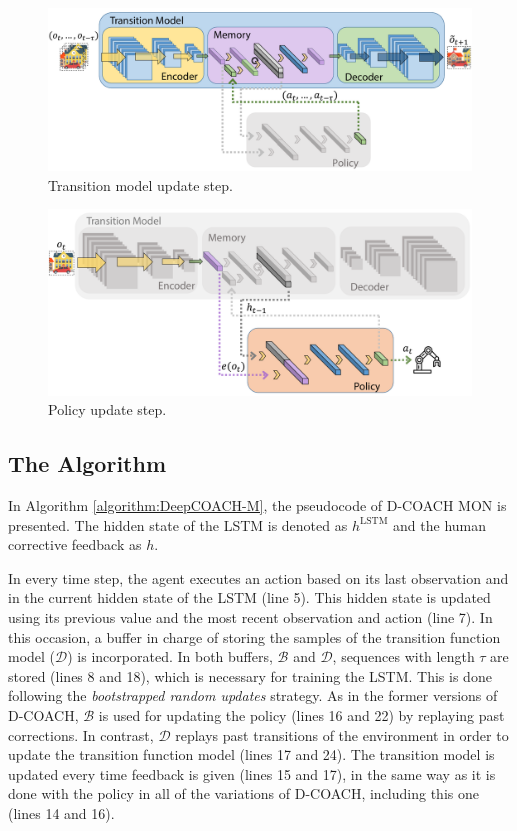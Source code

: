 \begin{figure}[h]
    \centering
    \includegraphics[width=0.93\linewidth]{imagenes/cap4/hd_mon1.pdf}
    \caption{Transition model update step.}
    \label{fig:hd_mon_train1}
\end{figure}

\begin{figure}[h]
    \centering
    \vspace{1.5cm}
    \includegraphics[width=0.93\linewidth]{imagenes/cap4/hd_mon2.pdf}
    \caption{Policy update step.}
    \label{fig:hd_mon_train2}
    \vspace{1.5cm}
\end{figure}


\subsection{The Algorithm}

In Algorithm \ref{algorithm:DeepCOACH-M}, the pseudocode of D-COACH MON is presented. The hidden state of the LSTM is denoted as  $h^{\mathrm{LSTM}}$ and the human corrective feedback as $h$.

In every time step, the agent executes an action based on its last observation and in the current hidden state of the LSTM (line 5). This hidden state is updated using its previous value and the most recent observation and action (line 7). In this occasion, a buffer in charge of storing the samples of the transition function model ($\mathcal{D}$) is incorporated. In both buffers, $\mathcal{B}$ and $\mathcal{D}$, sequences with length $\tau$ are stored (lines 8 and 18), which is necessary for training the LSTM. This is done following the \emph{bootstrapped random updates} \cite{hausknecht2015deep} strategy. As in the former versions of D-COACH, $\mathcal{B}$ is used for updating the policy (lines 16 and 22) by replaying past corrections. In contrast, $\mathcal{D}$ replays past transitions of the environment in order to update the transition function model (lines 17 and 24). The transition model is updated every time feedback is given (lines 15 and 17), in the same way as it is done with the policy in all of the variations of D-COACH, including this one (lines 14 and 16). 

